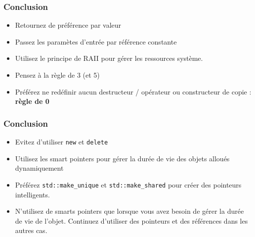 \documentclass[xetex,mathserif]{beamer}
\begin{document}
\begin{frame}[fragile]
\frametitle{Conclusion}

\begin{itemize}
	\item Retournez de préférence par valeur
	\item Passez les paramètes d'entrée par référence constante
	\item Utilisez le principe de RAII pour gérer les ressources système.
	\item Pensez à la règle de 3 (et 5)
	\item Préférez ne redéfinir aucun destructeur / opérateur ou constructeur de copie : \textbf{règle de 0}
\end{itemize}

\end{frame}

\begin{frame}[fragile]
\frametitle{Conclusion}

\begin{itemize}
	\item Evitez d'utiliser \lstinline{new} et \lstinline{delete} 
	\item Utilisez les smart pointers pour gérer la durée de vie des objets alloués dynamiquement
	\item Préférez \lstinline{std::make_unique} et \lstinline{std::make_shared} pour créer des pointeurs intelligents.
	\item N'utilisez de smarts pointers que lorsque vous avez besoin de gérer la durée de vie de l'objet. Continuez d'utiliser des pointeurs et des références dans les autres cas. 
\end{itemize}

\end{frame}
\end{document}
